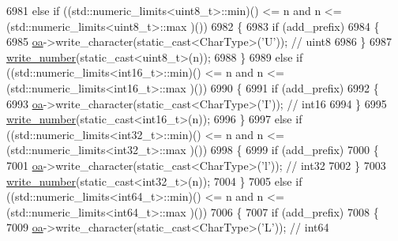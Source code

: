 \begin{DoxyCode}
6981             \textcolor{keywordflow}{else} \textcolor{keywordflow}{if} ((std::numeric\_limits<uint8\_t>::min)() <= n and n <= (std::numeric\_limits<uint8\_t>::max
      )())
6982             \{
6983                 \textcolor{keywordflow}{if} (add\_prefix)
6984                 \{
6985                     \hyperlink{classnlohmann_1_1detail_1_1binary__writer_a6f15b782a7900f50ef37d123008e601b}{oa}->write\_character(static\_cast<CharType>(\textcolor{charliteral}{'U'}));  \textcolor{comment}{// uint8}
6986                 \}
6987                 \hyperlink{classnlohmann_1_1detail_1_1binary__writer_a62cfd50a511371e718f37ad7bb29ae9d}{write\_number}(static\_cast<uint8\_t>(n));
6988             \}
6989             \textcolor{keywordflow}{else} \textcolor{keywordflow}{if} ((std::numeric\_limits<int16\_t>::min)() <= n and n <= (std::numeric\_limits<int16\_t>::max
      )())
6990             \{
6991                 \textcolor{keywordflow}{if} (add\_prefix)
6992                 \{
6993                     \hyperlink{classnlohmann_1_1detail_1_1binary__writer_a6f15b782a7900f50ef37d123008e601b}{oa}->write\_character(static\_cast<CharType>(\textcolor{charliteral}{'I'}));  \textcolor{comment}{// int16}
6994                 \}
6995                 \hyperlink{classnlohmann_1_1detail_1_1binary__writer_a62cfd50a511371e718f37ad7bb29ae9d}{write\_number}(static\_cast<int16\_t>(n));
6996             \}
6997             \textcolor{keywordflow}{else} \textcolor{keywordflow}{if} ((std::numeric\_limits<int32\_t>::min)() <= n and n <= (std::numeric\_limits<int32\_t>::max
      )())
6998             \{
6999                 \textcolor{keywordflow}{if} (add\_prefix)
7000                 \{
7001                     \hyperlink{classnlohmann_1_1detail_1_1binary__writer_a6f15b782a7900f50ef37d123008e601b}{oa}->write\_character(static\_cast<CharType>(\textcolor{charliteral}{'l'}));  \textcolor{comment}{// int32}
7002                 \}
7003                 \hyperlink{classnlohmann_1_1detail_1_1binary__writer_a62cfd50a511371e718f37ad7bb29ae9d}{write\_number}(static\_cast<int32\_t>(n));
7004             \}
7005             \textcolor{keywordflow}{else} \textcolor{keywordflow}{if} ((std::numeric\_limits<int64\_t>::min)() <= n and n <= (std::numeric\_limits<int64\_t>::max
      )())
7006             \{
7007                 \textcolor{keywordflow}{if} (add\_prefix)
7008                 \{
7009                     \hyperlink{classnlohmann_1_1detail_1_1binary__writer_a6f15b782a7900f50ef37d123008e601b}{oa}->write\_character(static\_cast<CharType>(\textcolor{charliteral}{'L'}));  \textcolor{comment}{// int64}

\end{DoxyCode}
